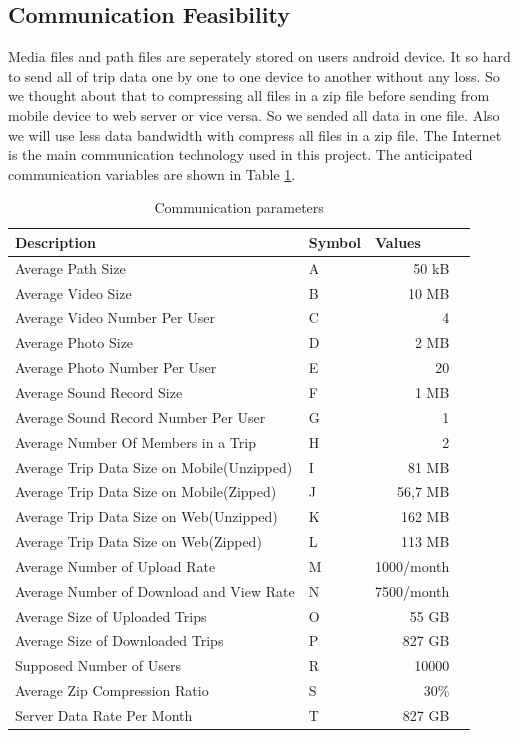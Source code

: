 \newpage
\subsection{Communication Feasibility}

Media files and path files are seperately stored on users android device. It so hard to send all of trip data one by one to one device to another without any loss. So we thought about that to compressing all files in a zip file before sending from mobile device to web server or vice versa. So we sended all data in one file. Also we will use less data bandwidth with compress all files in a zip file.
The Internet is the main communication technology used in this project. The
anticipated communication variables are shown in Table \ref{table:commparameters}.

\newpage
\begin{table}[!ht]
\centering
\caption{Communication parameters}
\label{table:commparameters}
\begin{tabular}{|l|l|r|r|}
\hline
\textbf{Description}                                                                   & \multicolumn{1}{l|}{\textbf{Symbol}} & \multicolumn{1}{l|}{\textbf{Values}} \\ \hline
Average Path Size & A  & 50 kB \\ \hline
Average Video Size & B & 10 MB \\ \hline
Average Video Number Per User & C & 4 \\ \hline
Average Photo Size & D & 2 MB \\ \hline
Average Photo Number Per User & E & 20 \\ \hline
Average Sound Record Size & F & 1 MB \\ \hline
Average Sound Record Number Per User & G & 1 \\ \hline
Average Number Of Members in a Trip & H & 2 \\ \hline
Average Trip Data Size on Mobile(Unzipped) & I & 81 MB \\ \hline
Average Trip Data Size on Mobile(Zipped) & J & 56,7 MB \\ \hline
Average Trip Data Size on Web(Unzipped) & K & 162 MB \\ \hline
Average Trip Data Size on Web(Zipped) & L & 113 MB \\ \hline
Average Number of Upload Rate & M & 1000/month \\ \hline
Average Number of Download and View Rate & N & 7500/month \\ \hline
Average Size of Uploaded Trips & O & 55 GB \\ \hline
Average Size of Downloaded Trips  & P & 827 GB \\ \hline
Supposed Number of Users  & R & 10000 \\ \hline
Average Zip Compression Ratio & S & 30\% \cite{zip} \\ \hline
Server Data Rate Per Month & T & 827 GB \\ \hline
\end{tabular}
\end{table}


